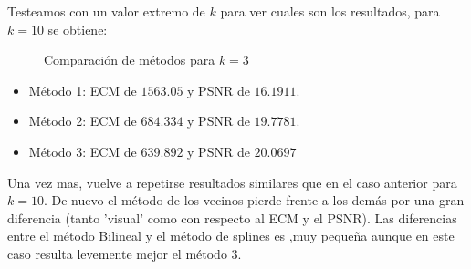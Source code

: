 Testeamos con un valor extremo de $k$ para ver cuales son los resultados, para $k=10$ se obtiene:

\begin{figure}[H]
    \centering
    \qquad
    \qquad
    \caption{Comparación de métodos para $k = 3$}%
    \label{fig:example}%
\end{figure}

\begin{itemize}
 \item Método 1: ECM de $1563.05$ y PSNR de $16.1911$.
 \item Método 2: ECM de $684.334$ y PSNR de $19.7781$.
 \item Método 3: ECM de $639.892$ y PSNR de $20.0697$
\end{itemize}

Una vez mas, vuelve a repetirse resultados similares que en el caso anterior para $k=10$. De nuevo el método de los vecinos pierde frente a los demás por una gran diferencia (tanto 'visual' como con respecto al ECM y el PSNR). Las diferencias entre el método Bilineal y el método de splines es ,muy pequeña aunque en este caso resulta levemente mejor el método 3.


